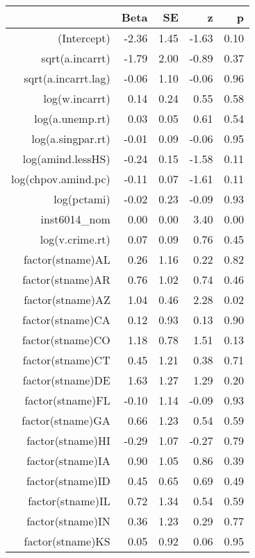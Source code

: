 \begin{table}[ht]
\centering
\begin{tabular}{rrrrr}
  \hline
 & Beta & SE & z & p \\ 
  \hline
(Intercept) & -2.36 & 1.45 & -1.63 & 0.10 \\ 
  sqrt(a.incarrt) & -1.79 & 2.00 & -0.89 & 0.37 \\ 
  sqrt(a.incarrt.lag) & -0.06 & 1.10 & -0.06 & 0.96 \\ 
  log(w.incarrt) & 0.14 & 0.24 & 0.55 & 0.58 \\ 
  log(a.unemp.rt) & 0.03 & 0.05 & 0.61 & 0.54 \\ 
  log(a.singpar.rt) & -0.01 & 0.09 & -0.06 & 0.95 \\ 
  log(amind.lessHS) & -0.24 & 0.15 & -1.58 & 0.11 \\ 
  log(chpov.amind.pc) & -0.11 & 0.07 & -1.61 & 0.11 \\ 
  log(pctami) & -0.02 & 0.23 & -0.09 & 0.93 \\ 
  inst6014\_nom & 0.00 & 0.00 & 3.40 & 0.00 \\ 
  log(v.crime.rt) & 0.07 & 0.09 & 0.76 & 0.45 \\ 
  factor(stname)AL & 0.26 & 1.16 & 0.22 & 0.82 \\ 
  factor(stname)AR & 0.76 & 1.02 & 0.74 & 0.46 \\ 
  factor(stname)AZ & 1.04 & 0.46 & 2.28 & 0.02 \\ 
  factor(stname)CA & 0.12 & 0.93 & 0.13 & 0.90 \\ 
  factor(stname)CO & 1.18 & 0.78 & 1.51 & 0.13 \\ 
  factor(stname)CT & 0.45 & 1.21 & 0.38 & 0.71 \\ 
  factor(stname)DE & 1.63 & 1.27 & 1.29 & 0.20 \\ 
  factor(stname)FL & -0.10 & 1.14 & -0.09 & 0.93 \\ 
  factor(stname)GA & 0.66 & 1.23 & 0.54 & 0.59 \\ 
  factor(stname)HI & -0.29 & 1.07 & -0.27 & 0.79 \\ 
  factor(stname)IA & 0.90 & 1.05 & 0.86 & 0.39 \\ 
  factor(stname)ID & 0.45 & 0.65 & 0.69 & 0.49 \\ 
  factor(stname)IL & 0.72 & 1.34 & 0.54 & 0.59 \\ 
  factor(stname)IN & 0.36 & 1.23 & 0.29 & 0.77 \\ 
  factor(stname)KS & 0.05 & 0.92 & 0.06 & 0.95 \\ 

\end{tabular}
\end{table}
